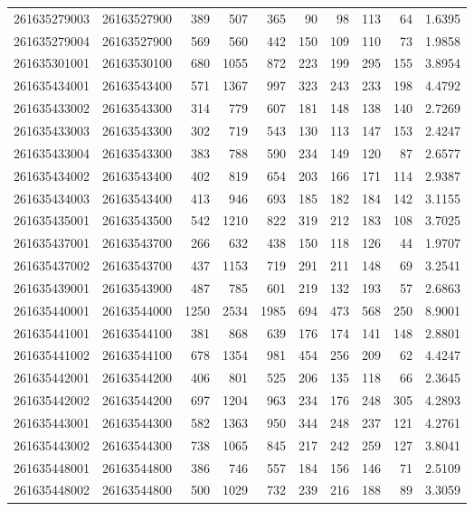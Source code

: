 \documentclass[
  11pt,
]{article}
\begin{document}
\begin{longtable}[t]{llrrrrrrrr}
261635279003 & 26163527900 & 389 & 507 & 365 & 90 & 98 & 113 & 64 & 1.6395\\
261635279004 & 26163527900 & 569 & 560 & 442 & 150 & 109 & 110 & 73 & 1.9858\\
261635301001 & 26163530100 & 680 & 1055 & 872 & 223 & 199 & 295 & 155 & 3.8954\\
261635434001 & 26163543400 & 571 & 1367 & 997 & 323 & 243 & 233 & 198 & 4.4792\\
261635433002 & 26163543300 & 314 & 779 & 607 & 181 & 148 & 138 & 140 & 2.7269\\
261635433003 & 26163543300 & 302 & 719 & 543 & 130 & 113 & 147 & 153 & 2.4247\\
261635433004 & 26163543300 & 383 & 788 & 590 & 234 & 149 & 120 & 87 & 2.6577\\
261635434002 & 26163543400 & 402 & 819 & 654 & 203 & 166 & 171 & 114 & 2.9387\\
261635434003 & 26163543400 & 413 & 946 & 693 & 185 & 182 & 184 & 142 & 3.1155\\
261635435001 & 26163543500 & 542 & 1210 & 822 & 319 & 212 & 183 & 108 & 3.7025\\
261635437001 & 26163543700 & 266 & 632 & 438 & 150 & 118 & 126 & 44 & 1.9707\\
261635437002 & 26163543700 & 437 & 1153 & 719 & 291 & 211 & 148 & 69 & 3.2541\\
261635439001 & 26163543900 & 487 & 785 & 601 & 219 & 132 & 193 & 57 & 2.6863\\
261635440001 & 26163544000 & 1250 & 2534 & 1985 & 694 & 473 & 568 & 250 & 8.9001\\
261635441001 & 26163544100 & 381 & 868 & 639 & 176 & 174 & 141 & 148 & 2.8801\\
261635441002 & 26163544100 & 678 & 1354 & 981 & 454 & 256 & 209 & 62 & 4.4247\\
261635442001 & 26163544200 & 406 & 801 & 525 & 206 & 135 & 118 & 66 & 2.3645\\
261635442002 & 26163544200 & 697 & 1204 & 963 & 234 & 176 & 248 & 305 & 4.2893\\
261635443001 & 26163544300 & 582 & 1363 & 950 & 344 & 248 & 237 & 121 & 4.2761\\
261635443002 & 26163544300 & 738 & 1065 & 845 & 217 & 242 & 259 & 127 & 3.8041\\
261635448001 & 26163544800 & 386 & 746 & 557 & 184 & 156 & 146 & 71 & 2.5109\\
261635448002 & 26163544800 & 500 & 1029 & 732 & 239 & 216 & 188 & 89 & 3.3059\\

\end{longtable}
\end{document}
